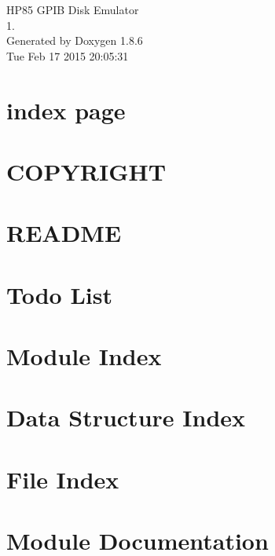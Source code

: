 \documentclass[twoside]{book}
\newcommand{\clearemptydoublepage}{%
  \newpage{\pagestyle{empty}\cleardoublepage}%
}
\begin{document}
\hypersetup{pageanchor=false}
\begin{titlepage}
\vspace*{7cm}
\begin{center}%
{\Large H\-P85 G\-P\-I\-B Disk Emulator \\[1ex]\large 1. }\\
\vspace*{1cm}
{\large Generated by Doxygen 1.8.6}\\
\vspace*{0.5cm}
{\small Tue Feb 17 2015 20:05:31}\\
\end{center}
\end{titlepage}
\clearemptydoublepage
\tableofcontents
\clearemptydoublepage
{}
\hypersetup{pageanchor=true}

\chapter{index page}
\label{index}\hypertarget{index}{}
\chapter{C\-O\-P\-Y\-R\-I\-G\-H\-T}
\label{md_COPYRIGHT}
\hypertarget{md_COPYRIGHT}{}

\chapter{R\-E\-A\-D\-M\-E}
\label{md_README}
\hypertarget{md_README}{}

\chapter{Todo List}
\label{todo}
\hypertarget{todo}{}

\chapter{Module Index}

\chapter{Data Structure Index}

\chapter{File Index}

\chapter{Module Documentation}

\end{document}
